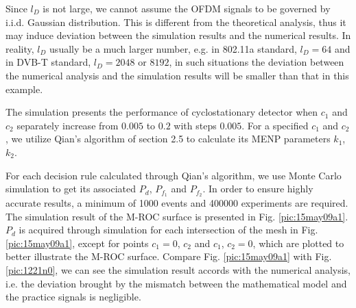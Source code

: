 Since $l_D$ is not large, we cannot assume the OFDM signals to be governed by i.i.d. Gaussian distribution. This is different from the theoretical analysis, thus it may induce deviation between the simulation results and the numerical results. In reality, $l_D$ usually be a much larger number, e.g. in 802.11a standard, $l_D = 64$ and  in DVB-T standard, $l_D = 2048$ or $8192$, in such situations the deviation between the numerical analysis and the simulation results will be smaller than that in this example.

The simulation presents the performance of cyclostationary detector when $c_1$ and $c_2$ separately increase from $0.005$ to $0.2$ with steps $0.005$. For a specified $c_1$ and $c_2$, we utilize Qian's algorithm of section 2.5 to calculate its MENP parameters $k_1$, $k_2$.

For each decision rule calculated through Qian's algorithm, we use Monte Carlo simulation to get its associated $P_d$, $P_{f_1}$ and $P_{f_2}$.   
In order to ensure highly accurate results, a minimum of 1000 events and 400000 experiments are required. The simulation result of the M-ROC surface is presented in Fig. \ref{pic:15may09a1}. $P_d$ is acquired through simulation for each intersection of the mesh in Fig. \ref{pic:15may09a1}, except for points $c_1 = 0$, $c_2$ and $c_1$, $c_2 = 0$, which are plotted to better illustrate the M-ROC surface. 
Compare Fig. \ref{pic:15may09a1} with Fig. \ref{pic:1221n0}, we can see the simulation result accords with the numerical analysis, i.e. the deviation brought by the mismatch between the mathematical model and the practice signals is negligible.
 
